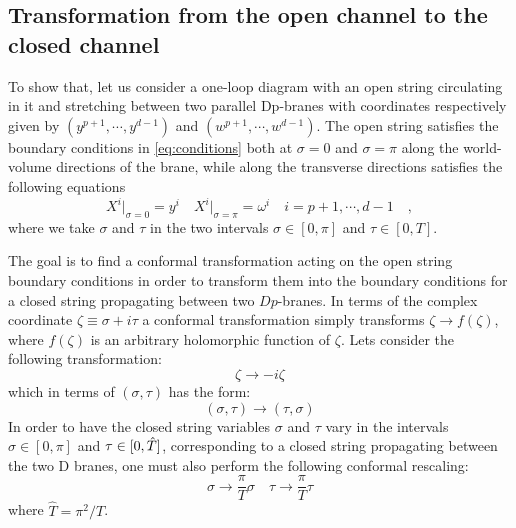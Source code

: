 \subsection{Transformation from the open channel to the closed channel}
\par To show that, let us consider a one-loop diagram with an open string
circulating in it and stretching between two parallel Dp-branes with coordinates
respectively given by $(y^{p+1},\cdots{}, y^{d-1})$ and $(w^{p+1},\cdots{},w^{d-1})$. The open string satisfies the boundary conditions in \eqref{eq:conditions} both at $\sigma = 0$ and $\sigma = \pi$ along the world-volume directions of the brane, while along the transverse directions satisfies the following equations
\begin{equation}
X^i\vert_{\sigma=0} = y^i\quad X^i\vert_{\sigma=\pi} = \omega^i\quad i = p+1,\cdots{},d-1\quad ,
 \end{equation}
where we take $\sigma$ and  $\tau$ in the two intervals $\sigma\in\left[0,\pi\right]$ and $\tau\in\left[0,T\right]$.
\par The goal is to find a conformal transformation acting on the open string boundary conditions in order to transform them into the boundary conditions for a closed string propagating between two $Dp$-branes. In terms of the complex coordinate $\zeta\equiv\sigma+i\tau$ a conformal transformation simply transforms $\zeta\rightarrow f\left(\zeta\right)$, where $f\left(\zeta\right)$ is an arbitrary holomorphic function of $\zeta$. Lets consider the following transformation:
\begin{equation}
\zeta \rightarrow -i\zeta
\end{equation}
which in terms of $\left(\sigma,\tau\right)$ has the form:
\begin{equation}
\left(\sigma,\tau\right)\rightarrow\left(\tau,\sigma\right)
\end{equation}
In order to have the closed string variables $\sigma$ and $\tau$ vary in the intervals $\sigma\in\left[0,\pi\right]$ and $\tau\in \small[ 0,\hat{T}\small]$, corresponding to a closed string propagating between the two D branes, one must also perform the following conformal rescaling:
\begin{equation}
	\sigma \rightarrow\frac{\pi}{T}\sigma\quad\tau\rightarrow\frac{\pi}{T}\tau
\end{equation}
where $\hat{T} = \pi^2/T$.
